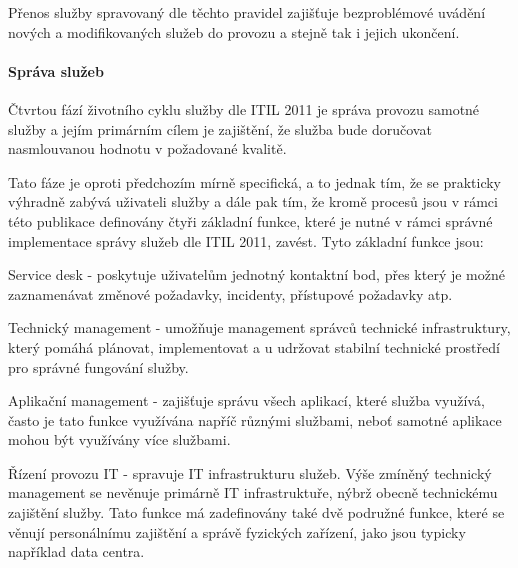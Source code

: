 \documentclass[
  digital,     %
  twoside,     %
  lof,         %
  lot,         %
]{fithesis4}
\begin{document}
Přenos služby spravovaný dle těchto pravidel zajišťuje bezproblémové uvádění nových a modifikovaných služeb do provozu a stejně tak i jejich ukončení. 
\paragraph{Správa služeb}
Čtvrtou fází životního cyklu služby dle ITIL 2011 je správa provozu samotné služby a jejím primárním cílem je zajištění, že služba bude doručovat nasmlouvanou hodnotu v požadované kvalitě.\parencite[s.~36]{Matula2017}

Tato fáze je oproti předchozím mírně specifická, a to jednak tím, že se prakticky výhradně zabývá uživateli služby a dále pak tím, že kromě procesů jsou v rámci této publikace definovány čtyři základní funkce, které je nutné v rámci správné implementace správy služeb dle ITIL 2011, zavést. Tyto základní funkce jsou: \parencite[s.~46]{Carlidge2007}
\begin{compactitem}
    \item Service desk - poskytuje uživatelům jednotný kontaktní bod, přes který je možné zaznamenávat změnové požadavky, incidenty, přístupové požadavky atp. 
    \item Technický management - umožňuje management správců technické infrastruktury, který pomáhá plánovat, implementovat a u udržovat stabilní technické prostředí pro správné fungování služby.
    \item Aplikační management - zajišťuje správu všech aplikací, které služba využívá, často je tato funkce využívána napříč různými službami, neboť samotné aplikace mohou být využívány více službami.
    \item Řízení provozu IT - spravuje IT infrastrukturu služeb. Výše zmíněný technický management se nevěnuje primárně IT infrastruktuře, nýbrž obecně technickému zajištění služby. Tato funkce má zadefinovány také dvě podružné funkce, které se věnují personálnímu zajištění a správě fyzických zařízení, jako jsou typicky například data centra.
\end{compactitem}
\end{document}
